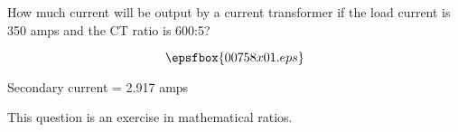 

How much current will be output by a current transformer if the load current is 350 amps and the CT ratio is 600:5?

$$\epsfbox{00758x01.eps}$$







Secondary current = 2.917 amps







This question is an exercise in mathematical ratios.




